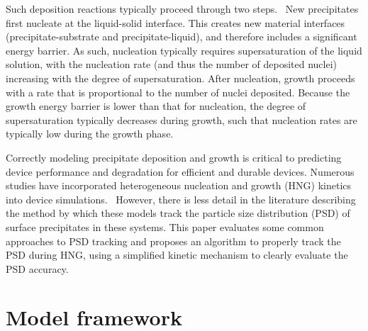 \documentclass[final,3p,times,twocolumn, 12pt]{elsarticle}
\begin{document}
Such deposition reactions typically proceed through two steps.~\cite{bib:classic_nuc_theory} New precipitates first nucleate at the liquid-solid interface. This creates new material interfaces (precipitate-substrate and precipitate-liquid), and therefore includes a significant energy barrier\cite{bib:Model_ex_2}. As such, nucleation typically requires supersaturation of the liquid solution, with the nucleation rate (and thus the number of deposited nuclei) increasing with the degree of supersaturation\cite{bib:supersat}.  After nucleation, growth proceeds with a rate that is proportional to the number of nuclei deposited. Because the growth energy barrier is lower than that for nucleation, the degree of supersaturation typically decreases  during growth, such that nucleation rates are typically low during the growth phase\cite{bib:Li-Cu_deposition}.

Correctly modeling precipitate deposition and  growth is critical to predicting device performance and degradation for efficient and durable devices. Numerous studies have incorporated heterogeneous nucleation and growth (HNG) kinetics into device simulations.~\cite{bib:Model_ex_1,bib:Model_ex_2,bib:Model_ex_3,bib:Model_ex_4,bib:Model_ex_5,bib:Model_ex_6, bib:Model_ex_7, bib:Model_ex_8,bib:Model_ex_9, bib:Model_ex_10} However, there is less detail in the literature describing the method by which these models track the particle size distribution (PSD) of surface precipitates in these systems. This paper evaluates some common approaches to PSD tracking and proposes an algorithm to properly track the PSD during HNG, using a simplified kinetic mechanism to clearly evaluate the PSD accuracy. 

\section{Model framework}
\label{sect:model-framework}
\end{document}
